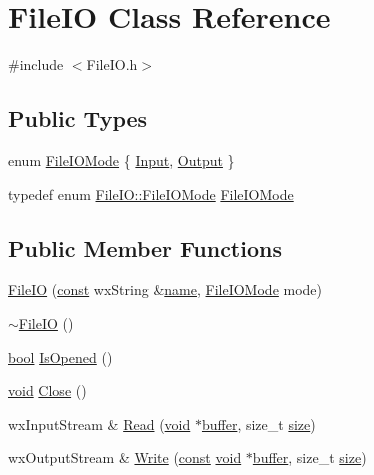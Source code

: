 \hypertarget{class_file_i_o}{}\section{File\+IO Class Reference}
\label{class_file_i_o}


{\ttfamily \#include $<$File\+I\+O.\+h$>$}

\subsection*{Public Types}
\begin{DoxyCompactItemize}
\item 
enum \hyperlink{class_file_i_o_a1a04aed593866589a39e524191a0d53a}{File\+I\+O\+Mode} \{ \hyperlink{class_file_i_o_a1a04aed593866589a39e524191a0d53aa28dba616e613bc5f67040d49f8406166}{Input}, 
\hyperlink{class_file_i_o_a1a04aed593866589a39e524191a0d53aae8c6cc79d9d51b6f8ee219647e315e49}{Output}
 \}
\item 
typedef enum \hyperlink{class_file_i_o_a1a04aed593866589a39e524191a0d53a}{File\+I\+O\+::\+File\+I\+O\+Mode} \hyperlink{class_file_i_o_af6406e5e99e23837710ec4a68351127b}{File\+I\+O\+Mode}
\end{DoxyCompactItemize}
\subsection*{Public Member Functions}
\begin{DoxyCompactItemize}
\item 
\hyperlink{class_file_i_o_a245ed953f2f0e7c025a8154fc7d4c2c2}{File\+IO} (\hyperlink{getopt1_8c_a2c212835823e3c54a8ab6d95c652660e}{const} wx\+String \&\hyperlink{lib_2expat_8h_a1b49b495b59f9e73205b69ad1a2965b0}{name}, \hyperlink{class_file_i_o_a1a04aed593866589a39e524191a0d53a}{File\+I\+O\+Mode} mode)
\item 
\hyperlink{class_file_i_o_adc3caa8f1e5d76274d8ffb8b5c17288b}{$\sim$\+File\+IO} ()
\item 
\hyperlink{mac_2config_2i386_2lib-src_2libsoxr_2soxr-config_8h_abb452686968e48b67397da5f97445f5b}{bool} \hyperlink{class_file_i_o_ae39dad6b538c0b2a82cf7599cda4473d}{Is\+Opened} ()
\item 
\hyperlink{sound_8c_ae35f5844602719cf66324f4de2a658b3}{void} \hyperlink{class_file_i_o_ad2bea32080134a57b72d60c7baac91ab}{Close} ()
\item 
wx\+Input\+Stream \& \hyperlink{class_file_i_o_a5de9adda6426573b19434d0db2f6620e}{Read} (\hyperlink{sound_8c_ae35f5844602719cf66324f4de2a658b3}{void} $\ast$\hyperlink{structbuffer}{buffer}, size\+\_\+t \hyperlink{group__lavu__mem_ga854352f53b148adc24983a58a1866d66}{size})
\item 
wx\+Output\+Stream \& \hyperlink{class_file_i_o_a70f1682561e1ec608530a54442915823}{Write} (\hyperlink{getopt1_8c_a2c212835823e3c54a8ab6d95c652660e}{const} \hyperlink{sound_8c_ae35f5844602719cf66324f4de2a658b3}{void} $\ast$\hyperlink{structbuffer}{buffer}, size\+\_\+t \hyperlink{group__lavu__mem_ga854352f53b148adc24983a58a1866d66}{size})
\end{DoxyCompactItemize}


